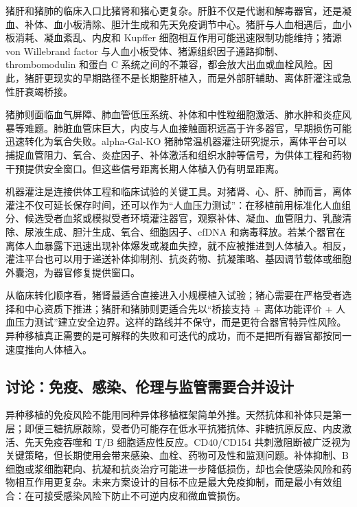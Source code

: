 \documentclass[
  chinese,
  11pt,a4paper]{article}
\begin{document}
猪肝和猪肺的临床入口比猪肾和猪心更复杂。肝脏不仅是代谢和解毒器官，还是凝血、补体、血小板清除、胆汁生成和先天免疫调节中心。猪肝与人血相遇后，血小板消耗、凝血紊乱、内皮和
Kupffer 细胞相互作用可能迅速限制功能维持；猪源 von Willebrand factor
与人血小板受体、猪源组织因子通路抑制、thrombomodulin 和蛋白 C
系统之间的不兼容，都会放大出血或血栓风险\citep{currentbarriersto2022, liverxenotransplantationfrom2026}。因此，猪肝更现实的早期路径不是长期整肝植入，而是外部肝辅助、离体肝灌注或急性肝衰竭桥接。

猪肺则面临血气屏障、肺血管低压系统、补体和中性粒细胞激活、肺水肿和炎症风暴等难题。肺脏血管床巨大，内皮与人血接触面积远高于许多器官，早期损伤可能迅速转化为氧合失败。alpha-Gal-KO
猪肺常温机器灌注研究提示，离体平台可以捕捉血管阻力、氧合、炎症因子、补体激活和组织水肿等信号，为供体工程和药物干预提供安全窗口\citep{advancesinxenotransplantation2025}。但这些信号距离长期人体植入仍有明显距离。

机器灌注是连接供体工程和临床试验的关键工具。对猪肾、心、肝、肺而言，离体灌注不仅可延长保存时间，还可以作为``人血压力测试''：在移植前用标准化人血组分、候选受者血浆或模拟受者环境灌注器官，观察补体、凝血、血管阻力、乳酸清除、尿液生成、胆汁生成、氧合、细胞因子、cfDNA
和病毒释放。若某个器官在离体人血暴露下迅速出现补体爆发或凝血失控，就不应被推进到人体植入。相反，灌注平台也可以用于递送补体抑制剂、抗炎药物、抗凝策略、基因调节载体或细胞外囊泡，为器官修复提供窗口\citep{bridgingtherapiesex2025}。

从临床转化顺序看，猪肾最适合直接进入小规模植入试验；猪心需要在严格受者选择和中心资质下推进；猪肝和猪肺则更适合先以``桥接支持
+ 离体功能评价 +
人血压力测试''建立安全边界。这样的路线并不保守，而是更符合器官特异性风险。异种移植真正需要的是可解释的失败和可迭代的成功，而不是把所有器官都按同一速度推向人体植入。

\subsection{讨论：免疫、感染、伦理与监管需要合并设计}\label{ux8ba8ux8bbaux514dux75abux611fux67d3ux4f26ux7406ux4e0eux76d1ux7ba1ux9700ux8981ux5408ux5e76ux8bbeux8ba1}

异种移植的免疫风险不能用同种异体移植框架简单外推。天然抗体和补体只是第一层；即便三糖抗原敲除，受者仍可能存在低水平抗猪抗体、非糖抗原反应、内皮激活、先天免疫吞噬和
T/B 细胞适应性反应。CD40/CD154
共刺激阻断被广泛视为关键策略，但长期使用会带来感染、血栓、药物可及性和监测问题\citep{advancingxenotransplantationto2022, currentstatusof2022}。补体抑制、B
细胞或浆细胞靶向、抗凝和抗炎治疗可能进一步降低损伤，却也会使感染风险和药物相互作用更复杂。未来方案设计的目标不应是最大免疫抑制，而是最小有效组合：在可接受感染风险下防止不可逆内皮和微血管损伤。
\end{document}
